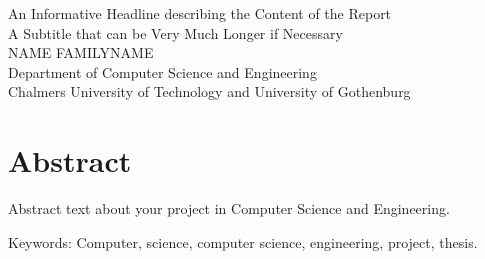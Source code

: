 An Informative Headline describing the Content of the Report\\
A Subtitle that can be Very Much Longer if Necessary\\
NAME FAMILYNAME\\
Department of Computer Science and Engineering\\
Chalmers University of Technology and University of Gothenburg\setlength{\parskip}{0.5cm}

\thispagestyle{plain}			%
\setlength{\parskip}{0pt plus 1.0pt}
\section*{Abstract}
Abstract text about your project in  Computer Science and Engineering.

\vfill
Keywords: Computer, science, computer science, engineering, project, thesis.

\newpage				%
\thispagestyle{empty}
\mbox{}